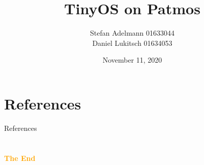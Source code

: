 \documentclass[aspectratio=43]{beamer}
\title{TinyOS on Patmos}
\author[S. Adelmann, D. Lukitsch]{Stefan Adelmann 01633044\\
                                    Daniel Lukitsch 01634053}
\institute[ACA]{
    VU 191.105%
    \\%
    Advanced Computer Architecture %
}
\date{November 11, 2020}
\begin{document}
    
    \frame{\titlepage}
    
     
    
    
    \section*{References} 
        \nocite{*}
        \begin{frame}{References}
            \printbibliography[type=article]
        \end{frame}

    \section{}
    \begin{frame}{}
        \centering
            \Huge\bfseries
        \textcolor{orange}{The End}
    \end{frame}
\end{document}
